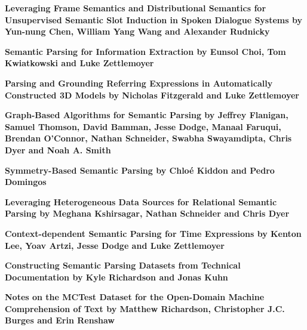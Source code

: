 \vspace{1ex}
\item[] {\bfseries Leveraging Frame Semantics and Distributional Semantics for Unsupervised Semantic Slot Induction in Spoken Dialogue Systems by Yun-nung Chen, William Yang Wang and Alexander Rudnicky
}

\vspace{1ex}
\item[] {\bfseries Semantic Parsing for Information Extraction by Eunsol Choi, Tom Kwiatkowski and Luke Zettlemoyer
}

\vspace{1ex}
\item[] {\bfseries Parsing and Grounding Referring Expressions in Automatically Constructed 3D Models by Nicholas Fitzgerald and Luke Zettlemoyer
}

\vspace{1ex}
\item[] {\bfseries Graph-Based Algorithms for Semantic Parsing by Jeffrey Flanigan, Samuel Thomson, David Bamman, Jesse Dodge, Manaal Faruqui, Brendan O'Connor, Nathan Schneider, Swabha Swayamdipta, Chris Dyer and Noah A. Smith
}
\item[$\bullet$] 

\vspace{1ex}
\item[] {\bfseries Symmetry-Based Semantic Parsing by Chloé Kiddon and Pedro Domingos
}

\vspace{1ex}
\item[] {\bfseries Leveraging Heterogeneous Data Sources for Relational Semantic Parsing by Meghana Kshirsagar, Nathan Schneider and Chris Dyer
}

\vspace{1ex}
\item[] {\bfseries Context-dependent Semantic Parsing for Time Expressions by Kenton Lee, Yoav Artzi, Jesse Dodge and Luke Zettlemoyer
}
\item[$\bullet$] 
\item[$\bullet$] 
\item[$\bullet$] 

\vspace{1ex}
\item[] {\bfseries Constructing Semantic Parsing Datasets from Technical Documentation by Kyle Richardson and Jonas Kuhn
}

\vspace{1ex}
\item[] {\bfseries Notes on the MCTest Dataset for the Open-Domain Machine Comprehension of Text by Matthew Richardson, Christopher J.C. Burges and Erin Renshaw
}
\item[$\bullet$] 
\item[$\bullet$] 
\item[$\bullet$] 
\item[$\bullet$] 
\item[$\bullet$] 
\item[$\bullet$] 

